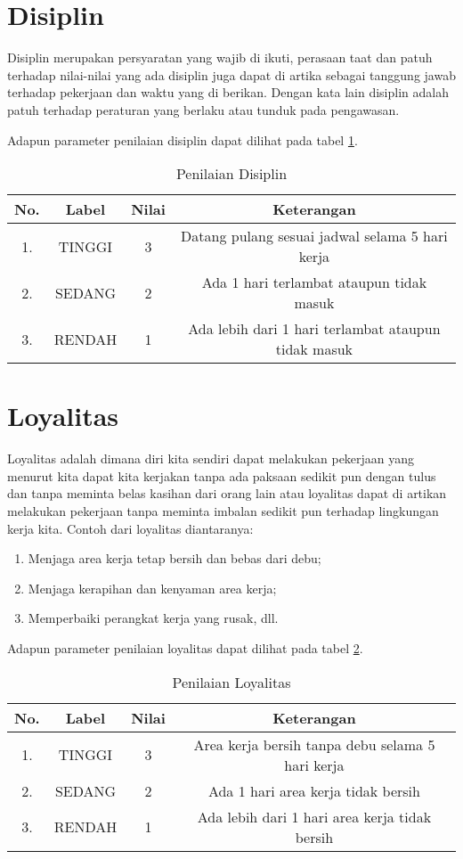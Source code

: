 \section{Disiplin}
Disiplin merupakan persyaratan yang wajib di ikuti, perasaan taat dan patuh terhadap nilai-nilai yang ada disiplin juga dapat di artika sebagai tanggung jawab terhadap pekerjaan dan waktu yang di berikan. Dengan kata lain disiplin adalah patuh terhadap peraturan yang berlaku
atau tunduk pada pengawasan.

Adapun parameter penilaian disiplin dapat dilihat pada tabel \ref{tab:nilaidisiplin}.

\begin{table}[H]
\caption{Penilaian Disiplin}
\centering
\begin{tabular}{|c|c|c|c|}
\hline
\textbf{No.}&\textbf{Label}&\textbf{Nilai}&\textbf{Keterangan}\\
\hline
1.&TINGGI&3&Datang pulang sesuai jadwal selama 5 hari kerja\\
\hline
2.&SEDANG&2&Ada 1 hari terlambat ataupun tidak masuk\\
\hline
3.&RENDAH&1&Ada lebih dari 1 hari terlambat ataupun tidak masuk\\
\hline
\end{tabular}
\label{tab:nilaidisiplin}
\end{table}

\section{Loyalitas}
Loyalitas adalah dimana diri kita sendiri dapat melakukan pekerjaan yang menurut kita dapat kita kerjakan tanpa ada paksaan sedikit pun
dengan tulus dan tanpa meminta belas kasihan dari orang lain atau loyalitas dapat di artikan melakukan pekerjaan tanpa meminta imbalan sedikit pun terhadap lingkungan kerja kita.
Contoh dari loyalitas diantaranya:
\begin{enumerate}
\item Menjaga area kerja tetap bersih dan bebas dari debu;
\item Menjaga kerapihan dan kenyaman area kerja;
\item Memperbaiki perangkat kerja yang rusak, dll.
\end{enumerate}
Adapun parameter penilaian loyalitas dapat dilihat pada tabel \ref{tab:nilailoyalitas}.

\begin{table}[H]
\caption{Penilaian Loyalitas}
\centering
\begin{tabular}{|c|c|c|c|}
\hline
\textbf{No.}&\textbf{Label}&\textbf{Nilai}&\textbf{Keterangan}\\
\hline
1.&TINGGI&3&Area kerja bersih tanpa debu selama 5 hari kerja\\
\hline
2.&SEDANG&2&Ada 1 hari area kerja tidak bersih\\
\hline
3.&RENDAH&1&Ada lebih dari 1 hari area kerja tidak bersih\\
\hline
\end{tabular}
\label{tab:nilailoyalitas}
\end{table}

